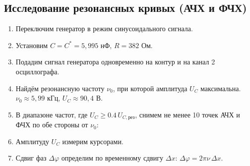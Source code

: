 \documentclass[a4paper]{article}
\begin{document}
\subsection{Исследование резонансных кривых (АЧХ и ФЧХ)}
\begin{enumerate}
    \item Переключим генератор в режим синусоидального сигнала.
    \item Установим $C = C^* = 5,995 \text{ нФ}$, $R = 382$ Ом.
    \item Подадим сигнал генератора одновременно на контур и на канал 2 осциллографа.
    \item Найдём резонансную частоту $\nu_0$, при которой амплитуда $U_C$ максимальна. $\nu_0 \approx 5,99$ кГц, $U_C \approx 90,4$ В.
    \item В диапазоне частот, где $U_C \geq 0.4\,U_{C,\text{рез}}$, снимем не менее 10 точек АЧХ и ФЧХ по обе стороны от $\nu_0$:
    \item Амплитуду $U_C$ измерим курсорами.
        \item Сдвиг фаз $\Delta\varphi$ определим по временному сдвигу $\Delta x$:  
        $\Delta\varphi = 2\pi\nu\,\Delta x$.


\end{enumerate}
\end{document}
